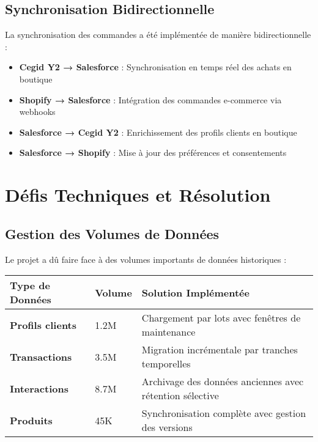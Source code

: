 \subsection{Synchronisation Bidirectionnelle}

\begin{mdframed}[backgroundcolor=lightgreen!20, linewidth=1pt]
La synchronisation des commandes a été implémentée de manière bidirectionnelle :

\begin{itemize}
    \item \textbf{Cegid Y2 → Salesforce} : Synchronisation en temps réel des achats en boutique
    \item \textbf{Shopify → Salesforce} : Intégration des commandes e-commerce via webhooks
    \item \textbf{Salesforce → Cegid Y2} : Enrichissement des profils clients en boutique
    \item \textbf{Salesforce → Shopify} : Mise à jour des préférences et consentements
\end{itemize}
\end{mdframed}

\section{Défis Techniques et Résolution}

\subsection{Gestion des Volumes de Données}

Le projet a dû faire face à des volumes importants de données historiques :

\begin{center}
\begin{tabular}{|>{\bfseries}p{4cm}|p{3cm}|p{6.5cm}|}
\hline
\rowcolor{lightblue} Type de Données & Volume & Solution Implémentée \\
\hline
Profils clients & 1.2M & Chargement par lots avec fenêtres de maintenance \\
\hline
Transactions & 3.5M & Migration incrémentale par tranches temporelles \\
\hline
Interactions & 8.7M & Archivage des données anciennes avec rétention sélective \\
\hline
Produits & 45K & Synchronisation complète avec gestion des versions \\
\hline
\end{tabular}
\end{center}

